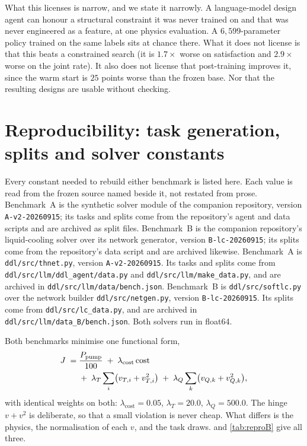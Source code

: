 What this licenses is narrow, and we state it narrowly.  A language-model design
agent can honour a structural constraint it was never trained on and that was never
engineered as a feature, at one physics evaluation.  A $6{,}599$-parameter policy
trained on the same labels sits at chance there. What it does not license is that this beats a constrained search (it is
$1.7\times$ worse on satisfaction and $2.9\times$ worse on the joint rate).  It also
does not license that post-training improves it, since the warm start is $25$ points
worse than the frozen base.  Nor that the resulting designs are usable without
checking.


\section{Reproducibility: task generation, splits and solver constants}
\label{supp:repro}

Every constant needed to rebuild either benchmark is listed here.
Each value is read from the frozen source named beside it, not restated from prose.
\ifblindreview
Benchmark~A is the synthetic solver module of the companion repository, version
\texttt{A-v2-20260915}; its tasks and splits come from the repository's agent and
data scripts and are archived as split files.  Benchmark~B is the companion
repository's liquid-cooling solver over its network generator, version
\texttt{B-lc-20260915}; its splits come from the repository's data script and are
archived likewise.
\else
Benchmark~A is \texttt{ddl/\allowbreak src/\allowbreak thnet.py}, version
\texttt{A-v2-20260915}.
Its tasks and splits come from
\texttt{ddl/\allowbreak src/\allowbreak llm/\allowbreak ddl\_agent/\allowbreak data.py}
and \texttt{ddl/\allowbreak src/\allowbreak llm/\allowbreak make\_data.py}, and are
archived in \texttt{ddl/\allowbreak src/\allowbreak llm/\allowbreak data/\allowbreak bench.json}.
Benchmark~B is \texttt{ddl/\allowbreak src/\allowbreak softlc.py} over the network builder
\texttt{ddl/\allowbreak src/\allowbreak netgen.py}, version \texttt{B-lc-20260915}.
Its splits come from \texttt{ddl/\allowbreak src/\allowbreak lc\_data.py}, and are archived in
\texttt{ddl/\allowbreak src/\allowbreak llm/\allowbreak data\_B/\allowbreak bench.json}.
\fi
Both solvers run in float64.

Both benchmarks minimise one functional form,
\begin{equation}
\begin{split}
J \;=\;& \frac{P_{\mathrm{pump}}}{100}
\;+\; \lambda_{\mathrm{cost}}\,\mathrm{cost} \\
&+\; \lambda_T \sum_i \bigl(v_{T,i} + v_{T,i}^{2}\bigr)
\;+\; \lambda_Q \sum_k \bigl(v_{Q,k} + v_{Q,k}^{2}\bigr),
\end{split}
\end{equation}
with identical weights on both: $\lambda_{\mathrm{cost}}=0.05$, $\lambda_T=20.0$,
$\lambda_Q=500.0$.
The hinge $v+v^2$ is deliberate, so that a small violation is never cheap.
What differs is the physics, the normalisation of each $v$, and the task draws.
 and \cref{tab:reproB} give all three.

